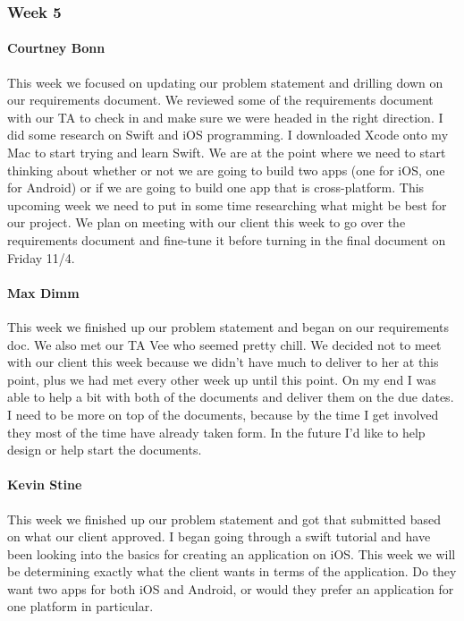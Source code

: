		\subsubsection{Week 5}

			\paragraph{Courtney Bonn}
			This week we focused on updating our problem statement and drilling down on our requirements document. We reviewed some of the requirements document with our TA to check in and make sure we were headed in the right direction. I did some research on Swift and iOS programming. I downloaded Xcode onto my Mac to start trying and learn Swift. We are at the point where we need to start thinking about whether or not we are going to build two apps (one for iOS, one for Android) or if we are going to build one app that is cross-platform. This upcoming week we need to put in some time researching what might be best for our project. We plan on meeting with our client this week to go over the requirements document and fine-tune it before turning in the final document on Friday 11/4.

			\paragraph{Max Dimm}
			This week we finished up our problem statement and began on our requirements doc. We also met our TA Vee who seemed pretty chill. We decided not to meet with our client this week because we didn't have much to deliver to her at this point, plus we had met every other week up until this point. On my end I was able to help a bit with both of the documents and deliver them on the due dates. I need to be more on top of the documents, because by the time I get involved they most of the time have already taken form. In the future I'd like to help design or help start the documents.

			\paragraph{Kevin Stine}
			This week we finished up our problem statement and got that submitted based on what our client approved. I began going through a swift tutorial and have been looking into the basics for creating an application on iOS. This week we will be determining exactly what the client wants in terms of the application. Do they want two apps for both iOS and Android, or would they prefer an application for one platform in particular.

